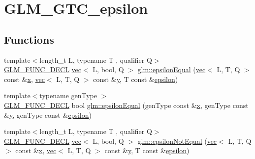 \hypertarget{group__gtc__epsilon}{}\section{G\+L\+M\+\_\+\+G\+T\+C\+\_\+epsilon}
\label{group__gtc__epsilon}
\subsection*{Functions}
\begin{DoxyCompactItemize}
\item 
{\footnotesize template$<$length\+\_\+t L, typename T , qualifier Q$>$ }\\\mbox{\hyperlink{setup_8hpp_ab2d052de21a70539923e9bcbf6e83a51}{G\+L\+M\+\_\+\+F\+U\+N\+C\+\_\+\+D\+E\+CL}} \mbox{\hyperlink{structglm_1_1vec}{vec}}$<$ L, bool, Q $>$ \mbox{\hyperlink{group__gtc__epsilon_ga91b417866cafadd076004778217a1844}{glm\+::epsilon\+Equal}} (\mbox{\hyperlink{structglm_1_1vec}{vec}}$<$ L, T, Q $>$ const \&\mbox{\hyperlink{_s_d_l__opengl_8h_ad0e63d0edcdbd3d79554076bf309fd47}{x}}, \mbox{\hyperlink{structglm_1_1vec}{vec}}$<$ L, T, Q $>$ const \&\mbox{\hyperlink{_s_d_l__opengl_8h_a1675d9d7bb68e1657ff028643b4037e3}{y}}, T const \&\mbox{\hyperlink{group__gtc__constants_ga2a1e57fc5592b69cfae84174cbfc9429}{epsilon}})
\item 
{\footnotesize template$<$typename gen\+Type $>$ }\\\mbox{\hyperlink{setup_8hpp_ab2d052de21a70539923e9bcbf6e83a51}{G\+L\+M\+\_\+\+F\+U\+N\+C\+\_\+\+D\+E\+CL}} bool \mbox{\hyperlink{group__gtc__epsilon_gaa7f227999ca09e7ca994e8b35aba47bb}{glm\+::epsilon\+Equal}} (gen\+Type const \&\mbox{\hyperlink{_s_d_l__opengl_8h_ad0e63d0edcdbd3d79554076bf309fd47}{x}}, gen\+Type const \&\mbox{\hyperlink{_s_d_l__opengl_8h_a1675d9d7bb68e1657ff028643b4037e3}{y}}, gen\+Type const \&\mbox{\hyperlink{group__gtc__constants_ga2a1e57fc5592b69cfae84174cbfc9429}{epsilon}})
\item 
{\footnotesize template$<$length\+\_\+t L, typename T , qualifier Q$>$ }\\\mbox{\hyperlink{setup_8hpp_ab2d052de21a70539923e9bcbf6e83a51}{G\+L\+M\+\_\+\+F\+U\+N\+C\+\_\+\+D\+E\+CL}} \mbox{\hyperlink{structglm_1_1vec}{vec}}$<$ L, bool, Q $>$ \mbox{\hyperlink{group__gtc__epsilon_gaf840d33b9a5261ec78dcd5125743b025}{glm\+::epsilon\+Not\+Equal}} (\mbox{\hyperlink{structglm_1_1vec}{vec}}$<$ L, T, Q $>$ const \&\mbox{\hyperlink{_s_d_l__opengl_8h_ad0e63d0edcdbd3d79554076bf309fd47}{x}}, \mbox{\hyperlink{structglm_1_1vec}{vec}}$<$ L, T, Q $>$ const \&\mbox{\hyperlink{_s_d_l__opengl_8h_a1675d9d7bb68e1657ff028643b4037e3}{y}}, T const \&\mbox{\hyperlink{group__gtc__constants_ga2a1e57fc5592b69cfae84174cbfc9429}{epsilon}})

\end{DoxyCompactItemize}
